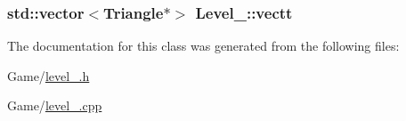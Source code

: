 \subsubsection[{\texorpdfstring{vectt}{vectt}}]{\setlength{\rightskip}{0pt plus 5cm}std\+::vector$<${\bf Triangle}$\ast$$>$ Level\+\_\+::vectt}\hypertarget{class_level__1_a105889f16d0a0c733256b6f1be02d156}{}\label{class_level__1_a105889f16d0a0c733256b6f1be02d156}


The documentation for this class was generated from the following files\+:\begin{DoxyCompactItemize}
\item 
Game/\hyperlink{level__1_8h}{level\+\_.\+h}\item 
Game/\hyperlink{level__1_8cpp}{level\+\_.\+cpp}\end{DoxyCompactItemize}
